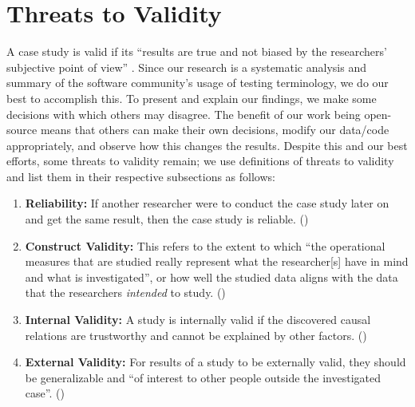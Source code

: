 \section{Threats to Validity}\label{threats}

A case study is valid if its ``results are true and not biased by the
researchers' subjective point of view'' \citep[p.~153]{RunesonAndHöst2009}.
Since our research is a systematic analysis and summary of the software
community's usage of testing terminology, we do our
best to accomplish this. To present and explain our findings,
we make some decisions with which others may disagree. The benefit of our work
being open-source means that others can make their own decisions, modify our
data/code appropriately, and observe how this changes the results. Despite this
and our best efforts, some threats to validity remain; we use
 definitions of threats to validity
and list them in their respective subsections as follows:
\begin{enumerate}
    \item \textbf{Reliability:} If another researcher were to conduct the case
          study later on and get the same result, then the case study is
          reliable. ()
    \item \textbf{Construct Validity:} This refers to the extent to which ``the
          operational measures that are studied really represent what the
          researcher[s] have in mind and what is investigated'', or how well
          the studied data aligns with the data that the researchers
          \emph{intended} to study. ()
    \item \textbf{Internal Validity:} A study is internally valid if the
          discovered causal relations are trustworthy and cannot be explained
          by other factors. %
          ()
    \item \textbf{External Validity:} For results of a study to be externally
          valid, they should be generalizable and ``of interest to other people
          outside the investigated case''. ()
\end{enumerate}

